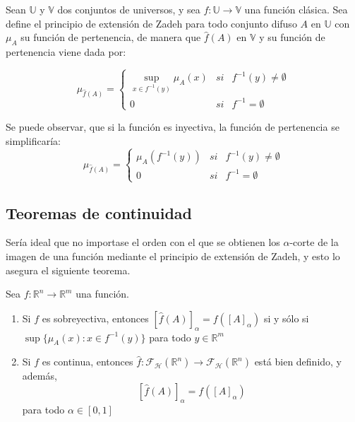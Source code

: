   \begin{definicion}
    Sean $\mathbb{U}$ y $\mathbb{V}$ dos conjuntos de universos, y sea $f: \mathbb{U} \longrightarrow \mathbb{V}$ una función clásica. Sea define el principio de extensión de Zadeh para todo conjunto difuso $A$ en $\mathbb{U}$ con $\mu_A$ su función de pertenencia, de manera que $\hat{f}(A)$ en $\mathbb{V}$ y su función de pertenencia viene dada por:
    
    $$
    \mu_{\hat{f}(A)}=\left\{
    \begin{array}{ccc}
      \sup_{x\in f^{-1}(y)} \mu_A(x) & si & f^{-1}(y)\neq\emptyset\\
      0 & si & f^{-1}=\emptyset
    \end{array}
    \right.
    $$
  \end{definicion}


  Se puede observar, que si la función es inyectiva, la función de pertenencia se simplificaría:
  $$
  \mu_{\hat{f}(A)}=\left\{
  \begin{array}{ccc}
    \mu_A(f^{-1}(y)) & si & f^{-1}(y)\neq\emptyset\\
    0 & si & f^{-1}=\emptyset
  \end{array}
  \right.
  $$

  \subsection{Teoremas de continuidad}
  Sería ideal que no importase el orden con el que se obtienen los $\alpha$-corte de la imagen de una función mediante el principio de extensión de Zadeh, y esto lo asegura el siguiente teorema.

  \begin{teorema}
  	\label{teorema:contfuzzy}
    Sea $f : \mathbb{R}^n \longrightarrow \mathbb{R}^m$ una función.
    \begin{enumerate}
    \item Si $f$ es sobreyectiva, entonces $[\hat{f}(A)]_\alpha = f([A]_\alpha)$ si y sólo si $\sup\{\mu_A(x) : x \in f^{-1}(y)\}$ para todo $y \in \mathbb{R}^m$
    \item Si $f$ es continua, entonces $\hat{f} : \mathcal{F}_\mathcal{H}(\mathbb{R}^n) \longrightarrow \mathcal{F}_\mathcal{H}(\mathbb{R}^n)$ está bien definido, y además,  
      $$[\hat{f}(A)]_\alpha = f([A]_\alpha)$$
      para todo $\alpha \in [0, 1]$
    \end{enumerate}
  \end{teorema}

